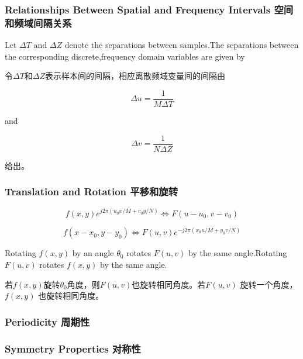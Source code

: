 \documentclass[12pt]{article}
\numberwithin{equation}{section}%
\begin{document}
\subsubsection{Relationships Between Spatial and Frequency Intervals 空间和频域间隔关系}

Let $\Delta T$ and $\Delta Z$ denote the separations between samples.The separations between the corresponding discrete,frequency domain variables are given by 

令$\Delta T$和$\Delta Z$表示样本间的间隔，相应离散频域变量间的间隔由

\begin{equation} \label{4.28}
\Delta u=\frac{1}{M\Delta T}
\end{equation}
 
and 

\begin{equation} \label{4.29}
\Delta v=\frac{1}{N\Delta Z}
\end{equation}

给出。

\subsubsection{Translation and Rotation 平移和旋转}

\begin{equation} \label{4.30}
f(x,y)e^{j2\pi (u_{0}x/M+v_{0}y/N)}\Leftrightarrow F(u-u_{0},v-v_{0})
\end{equation}

\begin{equation} \label{4.31}
f(x-x_{0},y-y_{0})\Leftrightarrow F(u,v)e^{-j2\pi (x_{0}u/M+y_{0}v/N)}
\end{equation}

Rotating $f(x,y)$ by an angle $\theta_{0}$ rotates $F(u,v)$ by the same angle.Rotating $F(u,v)$ rotates $f(x,y)$ by the same angle.

若$f(x,y)$旋转$\theta_{0}$角度，则$F(u,v)$也旋转相同角度。若$F(u,v)$ 旋转一个角度，$f(x,y)$ 也旋转相同角度。

\subsubsection{Periodicity 周期性}

\subsubsection{Symmetry Properties 对称性}
\end{document}
